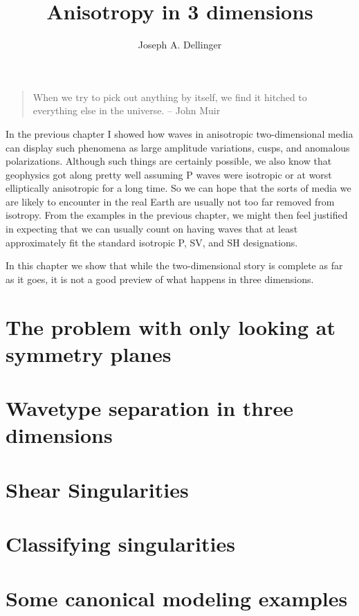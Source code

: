 \title{Anisotropy in 3 dimensions}
\author{Joseph A. Dellinger}

\begin{quotation}
{\sf
When we try to pick out anything by itself,
we find it hitched to everything else in the universe.
{\small -- John Muir}
}
\end{quotation}
\vspace{.7in}

In the previous chapter I showed how waves in anisotropic
two-dimensional media can display such phenomena as
large amplitude variations,
cusps,
and anomalous polarizations.
Although such things are certainly possible,
we also know that geophysics got along pretty well assuming P
waves were isotropic or at worst elliptically anisotropic for a long time.
So we can hope that the sorts of media we are likely to
encounter in the real Earth
are usually not too far removed from isotropy.
From the examples in the previous chapter,
we might then feel justified in expecting
that we can usually count on having waves that
at least approximately fit the standard isotropic P, SV, and SH
designations.

In this chapter we show that while the two-dimensional story is
complete as far as it goes,
it is not a good preview of what happens in three dimensions.

\section{The problem with only looking at symmetry planes}


\section{Wavetype separation in three dimensions}
\label{Separ3-Sec}


\section{Shear Singularities}


\section{Classifying singularities}


\section{Some canonical modeling examples}




